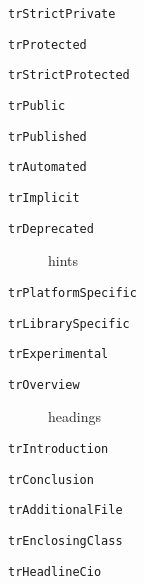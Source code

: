 \documentclass{report}
\begin{document}
\begin{list}{}
\begin{description}
\item[\texttt{trStrictPrivate}] \label{PasDoc_Languages-trStrictPrivate}
\index{}
 
\item[\texttt{trProtected}] \label{PasDoc_Languages-trProtected}
\index{}
 
\item[\texttt{trStrictProtected}] \label{PasDoc_Languages-trStrictProtected}
\index{}
 
\item[\texttt{trPublic}] \label{PasDoc_Languages-trPublic}
\index{}
 
\item[\texttt{trPublished}] \label{PasDoc_Languages-trPublished}
\index{}
 
\item[\texttt{trAutomated}] \label{PasDoc_Languages-trAutomated}
\index{}
 
\item[\texttt{trImplicit}] \label{PasDoc_Languages-trImplicit}
\index{}
 
\item[\texttt{trDeprecated}] \label{PasDoc_Languages-trDeprecated}
\index{}
hints
\item[\texttt{trPlatformSpecific}] \label{PasDoc_Languages-trPlatformSpecific}
\index{}
 
\item[\texttt{trLibrarySpecific}] \label{PasDoc_Languages-trLibrarySpecific}
\index{}
 
\item[\texttt{trExperimental}] \label{PasDoc_Languages-trExperimental}
\index{}
 
\item[\texttt{trOverview}] \label{PasDoc_Languages-trOverview}
\index{}
headings
\item[\texttt{trIntroduction}] \label{PasDoc_Languages-trIntroduction}
\index{}
 
\item[\texttt{trConclusion}] \label{PasDoc_Languages-trConclusion}
\index{}
 
\item[\texttt{trAdditionalFile}] \label{PasDoc_Languages-trAdditionalFile}
\index{}
 
\item[\texttt{trEnclosingClass}] \label{PasDoc_Languages-trEnclosingClass}
\index{}
 
\item[\texttt{trHeadlineCio}] \label{PasDoc_Languages-trHeadlineCio}
\index{}
 

\end{description}
\end{list}
\end{document}
